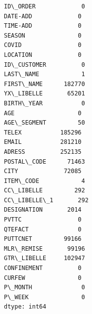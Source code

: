 \documentclass[11pt]{article}
\makeatletter
\newcommand{\boxspacing}{\kern\kvtcb@left@rule\kern\kvtcb@boxsep}
\newcommand{\prompt}[4]{
        \ttfamily\llap{{\color{#2}[#3]:\hspace{3pt}#4}}\vspace{-\baselineskip}
    }
\makeatother
\begin{document}
            \begin{tcolorbox}[breakable, size=fbox, boxrule=.5pt, pad at break*=1mm, opacityfill=0]
\prompt{Out}{outcolor}{36}{\boxspacing}
\begin{Verbatim}[commandchars=\\\{\}]
ID\_ORDER             0
DATE-ADD             0
TIME-ADD             0
SEASON               0
COVID                0
LOCATION             0
ID\_CUSTOMER          0
LAST\_NAME            1
FIRST\_NAME      182770
YX\_LIBELLE       65201
BIRTH\_YEAR           0
AGE                  0
AGE\_SEGMENT         50
TELEX           185296
EMAIL           281210
ADRESS          252135
POSTAL\_CODE      71463
CITY             72085
ITEM\_CODE            4
CC\_LIBELLE         292
CC\_LIBELLE\_1       292
DESIGNATION       2014
PVTTC                0
QTEFACT              0
PUTTCNET         99166
MLR\_REMISE       99196
GTR\_LIBELLE     102947
CONFINEMENT          0
CURFEW               0
P\_MONTH              0
P\_WEEK               0
dtype: int64
\end{Verbatim}
\end{tcolorbox}
        
\end{document}
